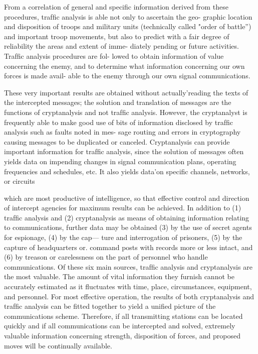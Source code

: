 \mypara From a correlation of general and speciﬁc information derived from
these procedures, trafﬁc analysis is able not only to ascertain the geo-
graphic location and disposition of troops and military units (technically
called "order of battle”) and important troop movements, but also to
predict with a fair degree of reliability the areas and extent of imme-
diately pending or future activities. Trafﬁc analysis procedures are fol-
lowed to obtain information of value concerning the enemy, and to
determine what information concerning our own forces is made avail-
able to the enemy through our own signal communications.

\mypara These very important results are obtained without actually'reading
the texts of the intercepted messages; the solution and translation of
messages are the functions of cryptanalysis and not trafﬁc analysis.
However, the cryptanalyst is frequently able to make good use of bits
of information disclosed by trafﬁc analysis such as faults noted in mes-
sage routing and errors in cryptography causing messages to be duplicated
or canceled. Cryptanalysis can provide important information for trafﬁc
analysis, since the solution of messages often yields data on impending
changes in signal communication plans, operating frequencies and schedules, etc. It also yields data'on speciﬁc channels, networks, or circuits

which are most productive of intelligence, so that effective control and
direction of intercept agencies for maximum results can be achieved.
\mypara In addition to (1) trafﬁc analysis and (2) cryptanalysis as means of
obtaining information relating to communications, further data may be
obtained (3) by the use of secret agents for espionage, (4) by the cap—
ture and interrogation of prisoners, (5) by the capture of headquarters
or. command posts with records more or less intact, and (6) by treason
or carelessness on the part of personnel who handle communications. Of
these six main sources, trafﬁc analysis and cryptanalysis are the most
valuable. The amount of vital information they furnish cannot be
accurately estimated as it ﬂuctuates with time, place, circumstances,
equipment, and personnel. For most effective operation, the results of
both cryptanalysis and trafﬁc analysis can be ﬁtted together to yield a
uniﬁed picture of the communications scheme. Therefore, if all transmitting stations can be located quickly and if all communications can be
intercepted and solved, extremely valuable information concerning
strength, disposition of forces, and proposed moves will be continually
available.

